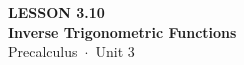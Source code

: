 \documentclass[aspectratio=169, 11pt]{beamer}
\begin{document}
{
\begin{frame}[plain]
  \vspace{2.8cm}\hspace{0.55cm}%
  \begin{minipage}{0.9\textwidth}
    {\color{goldacc}\bfseries\small LESSON 3.10}\\[0.5cm]
    {\color{white}\bfseries\LARGE Inverse Trigonometric Functions}\\[1.2cm]
    {\color{skymid}\small Precalculus~$\cdot$~Unit 3}
  \end{minipage}
\end{frame}
}

\begin{frame}[t, plain]
\end{frame}
\end{document}
